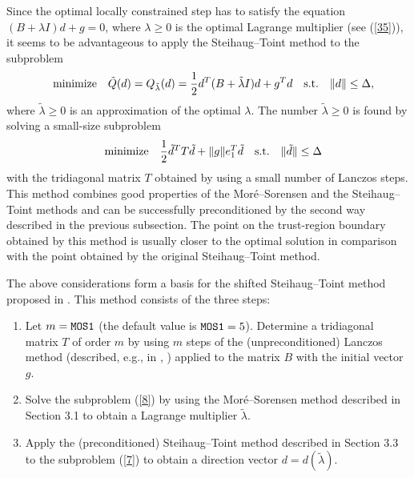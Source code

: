 \documentclass{esub2acm}
\begin{document}
\vspace{5mm}


\vspace{3mm}

Since the optimal locally constrained step has to satisfy the equation
$(B + \lambda I)d + g  =  0$, where $\lambda \geq 0$ is the optimal
Lagrange multiplier (see (\ref{35})), it seems to be
advantageous to apply the Steihaug--Toint method to the subproblem
%
\begin{equation}
\label{7}
\quad {\rm minimize} \quad \tilde{Q}(d) = Q_{\tilde{\lambda}}(d) =
\frac12 d^T (B + \tilde{\lambda}I) d + g^T d \quad
{\rm s.t.} \quad \|d\| \leq \Delta,
\end{equation}
%
where $\tilde{\lambda} \geq 0$ is an approximation of the optimal $\lambda$.
The number $\tilde{\lambda} \geq 0$
is found by solving a small-size subproblem
%
\begin{equation}\label{8}
\quad {\rm minimize} \quad \frac{1}{2} \tilde{d}^T T \tilde{d} + \|g\| e_1^T \tilde{d} \quad
{\rm s.t.} \quad \|\tilde{d}\| \leq \Delta
\end{equation}
%
with the tridiagonal matrix $T$ obtained by using a small number of Lanczos
steps. This method combines good properties of the Mor\'{e}--Sorensen and
the Steihaug--Toint methods and can be successfully preconditioned by the
second way described in the previous subsection. The point on the trust-region
boundary obtained by this method is usually closer to the optimal solution in
comparison with the point obtained by the original Steihaug--Toint method.

The above considerations form a basis for the shifted Steihaug--Toint method
proposed in \cite{lmv1}. This method consists of the
three steps:

\begin{enumerate}
\item Let $m = {\tt MOS1}$ (the default value is ${\tt MOS1} = 5$).
Determine a tridiagonal matrix $T$ of order $m$ by using $m$ steps of the
(unpreconditioned) Lanczos method (described, e.g., in \cite{glrt}, \cite{luk1})
applied to the matrix $B$ with the initial vector $g$.

\item Solve the subproblem (\ref{8})
by using the Mor\'{e}--Sorensen method described in Section 3.1 to obtain
a Lagrange multiplier $\tilde{\lambda}$.

\item Apply the (preconditioned) Steihaug--Toint method described in Section 3.3
to the subproblem (\ref{7})
to obtain a direction vector $d = d(\tilde{\lambda})$.
\end{enumerate}
\end{document}
